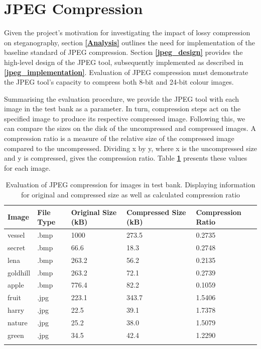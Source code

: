 \documentclass{l4proj}
\begin{document}
\section{JPEG Compression}\label{jpeg_compression}

Given the project's motivation for investigating the impact of lossy compression on steganography, section \textbf{\ref{Analysis}} outlines the need for implementation of the baseline standard of JPEG compression. Section \textbf{\ref{jpeg_design}} provides the high-level design of the JPEG tool, subsequently implemented as described in \textbf{\ref{jpeg_implementation}}. Evaluation of JPEG compression must demonstrate the JPEG tool's capacity to compress both 8-bit and 24-bit colour images.

Summarising the evaluation procedure, we provide the JPEG tool with each image in the test bank as a parameter. In turn, compression steps act on the specified image to produce its respective compressed image. Following this, we can compare the sizes on the disk of the uncompressed and compressed images. A compression ratio is a measure of the relative size of the compressed image compared to the uncompressed. Dividing x by y, where x is the uncompressed size and y is compressed, gives the compression ratio. Table \textbf{\ref{table:jpeg_compression}} presents these values for each image.

\begin{table}[]
\centering
\caption{Evaluation of JPEG compression for images in test bank. Displaying information for original and compressed size as well as calculated compression ratio}
\label{table:jpeg_compression}
\begin{tabular}{@{}lllll@{}}
\toprule
Image    & File Type       & Original Size (kB) & Compressed Size (kB) & Compression Ratio \\\midrule
vessel   & .bmp            & 1000               & 273.5                & 0.2735            \\
secret   & .bmp            & 66.6               & 18.3                 & 0.2748            \\
lena     & .bmp            & 263.2              & 56.2                 & 0.2135            \\
goldhill & .bmp            & 263.2              & 72.1                 & 0.2739            \\
apple    & .bmp            & 776.4              & 82.2                 & 0.1059            \\
fruit    & .jpg            & 223.1              & 343.7                & 1.5406            \\
harry    & .jpg            & 22.5               & 39.1                 & 1.7378            \\
nature   & .jpg            & 25.2               & 38.0                 & 1.5079            \\
green    & .jpg            & 34.5               & 42.4                 & 1.2290            \\\bottomrule
         &                 &                    &                      &                  
\end{tabular}
\end{table}
\end{document}
